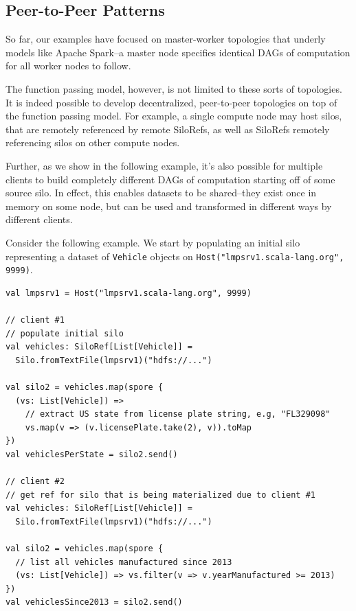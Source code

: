 \documentclass{jfp1}
\begin{document}
\subsection{Peer-to-Peer Patterns}
\label{sec:decentral}


So far, our examples have focused on master-worker topologies that underly
models like Apache Spark--\ie a master node specifies identical DAGs of
computation for all worker nodes to follow.

The function passing model, however, is not limited to these sorts of
topologies. It is indeed possible to develop decentralized, peer-to-peer
topologies on top of the function passing model. For example, a single compute
node may host silos, that are remotely referenced by remote SiloRefs, as well as
SiloRefs remotely referencing silos on other compute nodes.

Further, as we show in the following example, it's also possible for multiple
clients to build completely different DAGs of computation starting off of some
source silo. In effect, this enables datasets to be shared--they exist once in
memory on some node, but can be used and transformed in different ways by
different clients.

Consider the following example. We start by populating an initial silo
representing a dataset of \verb|Vehicle| objects on
\verb|Host("lmpsrv1.scala-lang.org", 9999)|.

\begin{lstlisting}
val lmpsrv1 = Host("lmpsrv1.scala-lang.org", 9999)

// client #1
// populate initial silo
val vehicles: SiloRef[List[Vehicle]] =
  Silo.fromTextFile(lmpsrv1)("hdfs://...")

val silo2 = vehicles.map(spore {
  (vs: List[Vehicle]) =>
    // extract US state from license plate string, e.g, "FL329098"
    vs.map(v => (v.licensePlate.take(2), v)).toMap
})
val vehiclesPerState = silo2.send()

// client #2
// get ref for silo that is being materialized due to client #1
val vehicles: SiloRef[List[Vehicle]] =
  Silo.fromTextFile(lmpsrv1)("hdfs://...")

val silo2 = vehicles.map(spore {
  // list all vehicles manufactured since 2013
  (vs: List[Vehicle]) => vs.filter(v => v.yearManufactured >= 2013)
})
val vehiclesSince2013 = silo2.send()
\end{lstlisting}
\end{document}
